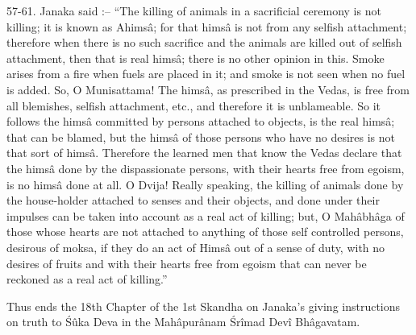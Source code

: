 57-61. Janaka said :-- ``The killing of animals in a sacrificial ceremony is not killing; it is known as Ahims\^a; for that hims\^a is not from any selfish attachment; therefore when there is no such sacrifice and the animals are killed out of selfish attachment, then that is real hims\^a; there is no other opinion in this. Smoke arises from a fire when fuels are placed in it; and smoke is not seen when no fuel is added. So, O Munisattama! The hims\^a, as prescribed in the Vedas, is free from all blemishes, selfish attachment, etc., and therefore it is unblameable. So it follows the hims\^a committed by persons attached to objects, is the real hims\^a; that can be blamed, but the hims\^a of those persons who have no desires is not that sort of hims\^a. Therefore the learned men that know the Vedas declare that the hims\^a done by the dispassionate persons, with their hearts free from egoism, is no hims\^a done at all. O Dvija! Really speaking, the killing of animals done by the house-holder attached to senses and their objects, and done under their impulses can be taken into account as a real act of killing; but, O Mah\^abh\^aga of those whose hearts are not attached to anything of those self controlled persons, desirous of moksa, if they do an act of Hims\^a out of a sense of duty, with no desires of fruits and with their hearts free from egoism that can never be reckoned as a real act of killing.''

Thus ends the 18th Chapter of the 1st Skandha on Janaka's giving instructions on truth to \'S\^uka Deva in the Mah\^apur\^anam \'Sr\^imad Dev\^i Bh\^agavatam.